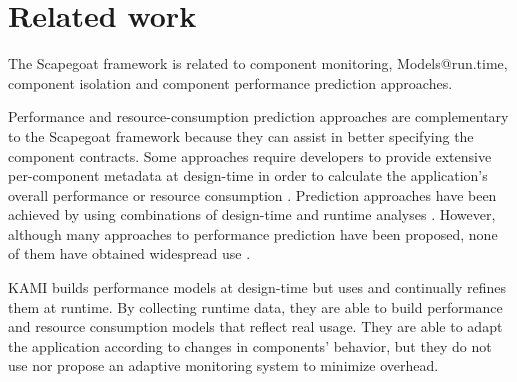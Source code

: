 \section{Related work}\label{sec:related}

The Scapegoat framework is related to component monitoring, Models@run.time, component isolation and component performance prediction approaches.

Performance and resource-consumption prediction approaches are complementary to the Scapegoat framework because they can assist in better specifying the component contracts.
Some approaches require developers to provide extensive per-component metadata at design-time in order to calculate the application's overall performance or resource consumption \cite{Becker:2007:MPP:1216993.1217006,Jonge03scenario-basedprediction}.
Prediction approaches have been achieved by using combinations of design-time and runtime analyses \cite{autili2012hybrid}.
However, although many approaches to performance prediction have been proposed, none of them have obtained widespread use \cite{Koziolek:2006:QDD:2171366.2171393}.


KAMI \cite{Ghezzi2009} builds performance models at design-time but uses and continually refines them at runtime.
By collecting runtime data, they are able to build performance and resource consumption models that reflect real usage.
They are able to adapt the application according to changes in components' behavior, but they do not use nor propose an adaptive monitoring system to minimize overhead.

